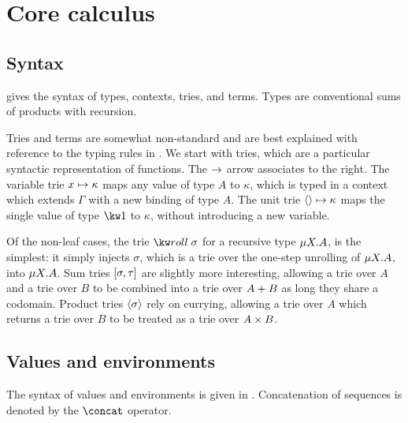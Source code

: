 \section{Core calculus}

\subsection{Syntax}

 gives the syntax of types, contexts, tries, and
terms. Types are conventional sums of products with recursion.



Tries \cite{hinze00} and terms are somewhat non-standard and are best explained
with reference to the typing rules in . We
start with tries, which are a particular syntactic representation of functions.
The $\to$ arrow associates to the right. The variable trie
$x \mapsto {\kappa}$ maps any value of type $A$ to $\kappa$, which is
typed in a context which extends $\Gamma$ with a new binding of type $A$. The
unit trie $\langle\rangle \mapsto {\kappa}$ maps the single value of type $\tyUnit$ to
$\kappa$, without introducing a new variable.



Of the non-leaf cases, the trie $\trieRoll{\sigma}$ for a recursive type
$\mu{X}.{A}$, is the simplest: it simply injects $\sigma$, which is a
trie over the one-step unrolling of $\mu{X}.{A}$, into
$\mu{X}.{A}$. Sum tries $[\sigma,\tau]$ are slightly more
interesting, allowing a trie over $A$ and a trie over $B$ to be combined into a
trie over ${A}+{B}$ as long they share a codomain. Product tries
${\langle\sigma\rangle}$ rely on currying, allowing a trie over $A$ which returns a
trie over $B$ to be treated as a trie over ${A}\times{B}$.

\subsection{Values and environments}




The syntax of values and environments is given in
. Concatenation of sequences is denoted by
the $\concat$ operator.
